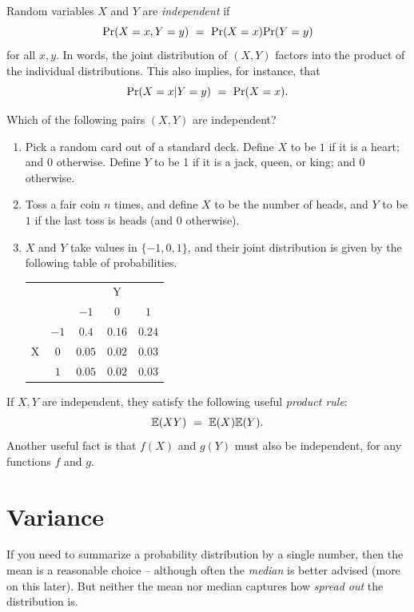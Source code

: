 Random variables $X$ and $Y$ are {\it independent} if
$$ \mbox{\rm Pr}(X=x, Y=y) \ = \ \mbox{\rm Pr}(X=x) \mbox{\rm Pr}(Y=y) $$
for all $x,y$. In words, the joint distribution of $(X,Y)$ factors into the product
of the individual distributions. This also implies, for instance, that
$$ \mbox{\rm Pr}(X = x | Y = y) \ = \ \mbox{\rm Pr}(X=x) .$$

Which of the following pairs $(X,Y)$ are independent?
\begin{enumerate}
\item Pick a random card out of a standard deck. Define $X$ to be $1$ if it is a heart;
 and $0$ otherwise. Define $Y$ to be 1 if it is a jack, queen, or king; and $0$ otherwise.
\item Toss a fair coin $n$ times, and define $X$ to be the number of heads, and $Y$ to 
be $1$ if the last toss is heads (and $0$ otherwise).
\item $X$ and $Y$ take values in $\{-1,0,1\}$, and their joint distribution is given by 
the following table of probabilities.

\begin{center}
\begin{tabular}{|cc|ccc|} \hline
\multicolumn{2}{|c|}{} & \multicolumn{3}{c|}{Y} \\ 
\multicolumn{2}{|c|}{}        & $-1$   & $0$    & $1$ \\ \hline
\multirow{3}{*}{X}     & $-1$ & $0.4$  & $0.16$ & $0.24$ \\ 
                       & $0$  & $0.05$ & $0.02$ & $0.03$ \\ 
                       & $1$  & $0.05$ & $0.02$ & $0.03$ \\ \hline
\end{tabular} 
\end{center}
\end{enumerate}

If $X,Y$ are independent, they satisfy the following useful {\it product rule}:
$$ \mathbb{E}(XY) \ = \ \mathbb{E}(X) \mathbb{E}(Y) .$$
Another useful fact is that $f(X)$ and $g(Y)$ must also be independent, for any
functions $f$ and $g$.

\section{Variance}

If you need to summarize a probability distribution by a single number, then 
the mean is a reasonable choice -- although often the {\it median} is better 
advised (more on this later). But neither the mean nor median captures how
{\it spread out} the distribution is.

